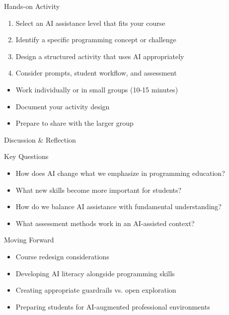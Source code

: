\documentclass{beamer}
\begin{document}
\begin{frame}{Hands-on Activity}
    \begin{tcolorbox}[colback=myorange!5,colframe=myorange,title=Design an AI-Integrated Classroom Activity]
        \begin{enumerate}
            \item Select an AI assistance level that fits your course
            \item Identify a specific programming concept or challenge
            \item Design a structured activity that uses AI appropriately
            \item Consider prompts, student workflow, and assessment
        \end{enumerate}
    \end{tcolorbox}
    
    \begin{itemize}
        \item Work individually or in small groups (10-15 minutes)
        \item Document your activity design
        \item Prepare to share with the larger group
    \end{itemize}
\end{frame}

\begin{frame}{Discussion \& Reflection}
    \begin{block}{Key Questions}
        \begin{itemize}
            \item How does AI change what we emphasize in programming education?
            \item What new skills become more important for students?
            \item How do we balance AI assistance with fundamental understanding?
            \item What assessment methods work in an AI-assisted context?
        \end{itemize}
    \end{block}
    
    \begin{alertblock}{Moving Forward}
        \begin{itemize}
            \item Course redesign considerations
            \item Developing AI literacy alongside programming skills
            \item Creating appropriate guardrails vs. open exploration
            \item Preparing students for AI-augmented professional environments
        \end{itemize}
    \end{alertblock}
\end{frame}
\end{document}
